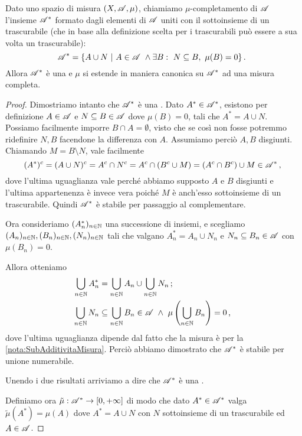 \begin{proposition}\label{prop:CompletamentoMisura}
	Dato uno spazio di misura $(X,\mathscr A,\mu)$, chiamiamo $\mu$-completamento di $\mathscr A$ l'insieme $\mathscr A^*$ formato dagli elementi di $\mathscr A$ uniti con il sottoinsieme di un trascurabile (che in base alla definizione scelta per i trascurabili può essere a sua volta un trascurabile):
	\begin{equation*}
		\A^*=\{A\cup N\ |\ A\in\A\ \wedge \exists B:\ N\subseteq B,\ \mu(B)=0\} \punto
	\end{equation*}
	Allora $\mathscr A^*$ è una \sigalg{} e $\mu$ si estende in maniera canonica su $\mathscr A^*$ ad una misura completa.
\end{proposition}
\begin{proof}
	Dimostriamo intanto che $\mathscr A^*$ è una \sigalg{}.
	Dato $A^*\in\mathscr A^*$, esistono per definizione $A\in\mathscr A$ e $N\subseteq B\in\mathscr A$ dove $\mu(B)=0$, tali che $A^*=A\cup N$. Possiamo facilmente imporre $B\cap A=\emptyset$, visto che se così non fosse potremmo ridefinire $N,B$ facendone la differenza con $A$. Assumiamo perciò $A,B$ disgiunti.
	Chiamando $M=B\setminus N$, vale facilmente
	\begin{equation*}
		(A^*)^c=(A\cup N)^c=A^c\cap N^c=A^c\cap(B^c\cup M)=(A^c\cap B^c )\cup M \in\mathscr A^* \, \text{, }
	\end{equation*}
	dove l'ultima uguaglianza vale perché abbiamo supposto $A$ e $B$ disgiunti e l'ultima appartenenza è invece vera poiché $M$ è anch'esso sottoinsieme di un trascurabile. Quindi $\mathscr A^*$ è stabile per passaggio al complementare.
	
	Ora consideriamo $(A^*_n)_{n\in\mathbb N}$ una successione di insiemi, e scegliamo $(A_n)_{n\in\mathbb N},(B_n)_{n\in\mathbb N},(N_n)_{n\in\mathbb N}$ tali che valgano $A^*_n=A_n\cup N_n$ e $N_n\subseteq B_n\in\mathscr A$ con $\mu(B_n)=0$.
	
	Allora otteniamo
	\begin{align*}
		\bigcup_{n\in\N}A^*_n &=\bigcup_{n\in\N}A_n \cup \bigcup_{n\in\N}N_n \puntovirgola\\
		\bigcup_{n\in\N}N_n &\subseteq \bigcup_{n\in\N}B_n\in\A\ \wedge\ \mu\left(\bigcup_{n\in\N}B_n\right)=0 \virgola
	\end{align*}
	dove l'ultima uguaglianza dipende dal fatto che la misura è \sigsubadd{} per la \cref{nota:SubAdditivitaMisura}. Perciò abbiamo dimostrato che $\mathscr A^*$ è stabile per unione numerabile.
	
	Unendo i due risultati arriviamo a dire che $\mathscr A^*$ è una \sigalg{}.
	
	Definiamo ora $\tilde\mu:\mathscr A^*\to[0,+\infty]$ di modo che dato $A^*\in\mathscr A^*$ valga $\tilde\mu(A^*)=\mu(A)$ dove $A^*=A\cup N$ con $N$ sottoinsieme di un trascurabile ed $A\in\mathscr A$.
	

\end{proof}

